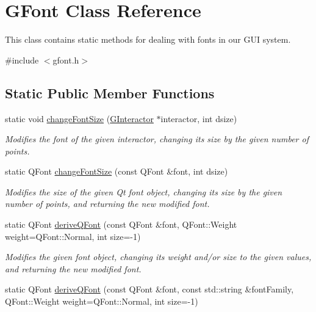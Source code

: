 \hypertarget{classGFont}{}\section{G\+Font Class Reference}
\label{classGFont}


This class contains static methods for dealing with fonts in our G\+UI system.  




{\ttfamily \#include $<$gfont.\+h$>$}

\subsection*{Static Public Member Functions}
\begin{DoxyCompactItemize}
\item 
static void \mbox{\hyperlink{classGFont_ae6714d087455b3431d6dce6f1202659f}{change\+Font\+Size}} (\mbox{\hyperlink{classGInteractor}{G\+Interactor}} $\ast$interactor, int dsize)
\begin{DoxyCompactList}\small\item\em Modifies the font of the given interactor, changing its size by the given number of points. \end{DoxyCompactList}\item 
static Q\+Font \mbox{\hyperlink{classGFont_a1f55c64940d99e62528d5bfc634123f8}{change\+Font\+Size}} (const Q\+Font \&font, int dsize)
\begin{DoxyCompactList}\small\item\em Modifies the size of the given Qt font object, changing its size by the given number of points, and returning the new modified font. \end{DoxyCompactList}\item 
static Q\+Font \mbox{\hyperlink{classGFont_ac36fbf8f4ebf4558559f98d54277529f}{derive\+Q\+Font}} (const Q\+Font \&font, Q\+Font\+::\+Weight weight=Q\+Font\+::\+Normal, int size=-\/1)
\begin{DoxyCompactList}\small\item\em Modifies the given font object, changing its weight and/or size to the given values, and returning the new modified font. \end{DoxyCompactList}\item 
static Q\+Font \mbox{\hyperlink{classGFont_aa0a91decdb8d9bec6e875ebac9d81c97}{derive\+Q\+Font}} (const Q\+Font \&font, const std\+::string \&font\+Family, Q\+Font\+::\+Weight weight=Q\+Font\+::\+Normal, int size=-\/1)

\end{DoxyCompactItemize}
